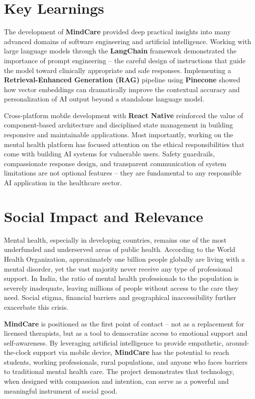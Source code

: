 \documentclass[a4paper,12pt]{report}
\begin{document}
\section{Key Learnings}
The development of \textbf{MindCare} provided deep practical insights into many advanced domains of software engineering and artificial intelligence. Working with large language models through the \textbf{LangChain} framework demonstrated the importance of prompt engineering -- the careful design of instructions that guide the model toward clinically appropriate and safe responses. Implementing a \textbf{Retrieval-Enhanced Generation (RAG)} pipeline using \textbf{Pinecone} showed how vector embeddings can dramatically improve the contextual accuracy and personalization of AI output beyond a standalone language model.

Cross-platform mobile development with \textbf{React Native} reinforced the value of component-based architecture and disciplined state management in building responsive and maintainable applications. Most importantly, working on the mental health platform has focused attention on the ethical responsibilities that come with building AI systems for vulnerable users. Safety guardrails, compassionate response design, and transparent communication of system limitations are not optional features -- they are fundamental to any responsible AI application in the healthcare sector.

\section{Social Impact and Relevance}
Mental health, especially in developing countries, remains one of the most underfunded and underserved areas of public health. According to the World Health Organization, approximately one billion people globally are living with a mental disorder, yet the vast majority never receive any type of professional support. In India, the ratio of mental health professionals to the population is severely inadequate, leaving millions of people without access to the care they need. Social stigma, financial barriers and geographical inaccessibility further exacerbate this crisis.

\textbf{MindCare} is positioned as the first point of contact -- not as a replacement for licensed therapists, but as a tool to democratize access to emotional support and self-awareness. By leveraging artificial intelligence to provide empathetic, around-the-clock support via mobile device, \textbf{MindCare} has the potential to reach students, working professionals, rural populations, and anyone who faces barriers to traditional mental health care. The project demonstrates that technology, when designed with compassion and intention, can serve as a powerful and meaningful instrument of social good.
\end{document}
